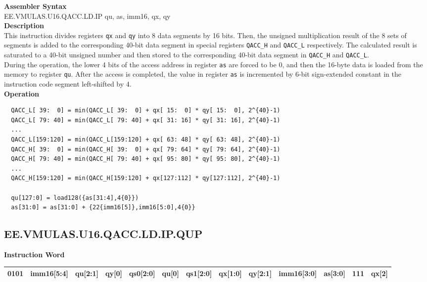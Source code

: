 \textbf{Assembler Syntax} \\
EE.VMULAS.U16.QACC.LD.IP qu, as, imm16, qx, qy \\
\textbf{Description} \\
This instruction divides registers \lstinline{qx} and \lstinline{qy} into 8 data segments by 16 bits. Then, the unsigned multiplication result of the 8 sets of segments is added to the corresponding 40-bit data segment in special registers \lstinline{QACC_H} and \lstinline{QACC_L} respectively. The calculated result is saturated to a 40-bit unsigned number and then stored to the corresponding 40-bit data segment in \lstinline{QACC_H} and \lstinline{QACC_L}.\\
During the operation, the lower 4 bits of the access address in register \lstinline{as} are forced to be 0, and then the 16-byte data is loaded from the memory to register \lstinline{qu}. After the access is completed, the value in register \lstinline{as} is incremented by 6-bit sign-extended constant in the instruction code segment left-shifted by 4.\\
\textbf{Operation}
\begin{lstlisting}
  QACC_L[ 39:  0] = min(QACC_L[ 39:  0] + qx[ 15:  0] * qy[ 15:  0], 2^{40}-1)
  QACC_L[ 79: 40] = min(QACC_L[ 79: 40] + qx[ 31: 16] * qy[ 31: 16], 2^{40}-1)
  ...
  QACC_L[159:120] = min(QACC_L[159:120] + qx[ 63: 48] * qy[ 63: 48], 2^{40}-1)
  QACC_H[ 39:  0] = min(QACC_H[ 39:  0] + qx[ 79: 64] * qy[ 79: 64], 2^{40}-1)
  QACC_H[ 79: 40] = min(QACC_H[ 79: 40] + qx[ 95: 80] * qy[ 95: 80], 2^{40}-1)
  ...
  QACC_H[159:120] = min(QACC_H[159:120] + qx[127:112] * qy[127:112], 2^{40}-1)

  qu[127:0] = load128({as[31:4],4{0}})
  as[31:0] = as[31:0] + {22{imm16[5]},imm16[5:0],4{0}}
\end{lstlisting}

\clearpage
\subsection{EE.VMULAS.U16.QACC.LD.IP.QUP}\label{instruction:EEVMULASU16QACCLDIPQUP}
\setlength\tabcolsep{5pt}
\textbf{Instruction Word} \\
\begin{tabular}{|c|c|c|c|c|c|c|c|c|c|c|c|c|}
	\hline
	0101 & imm16[5:4] & qu[2:1] & qy[0] & qs0[2:0] & qu[0] & qs1[2:0] & qx[1:0] & qy[2:1] & imm16[3:0] & as[3:0] & 111 & qx[2] \\
	\hline
\end{tabular}

